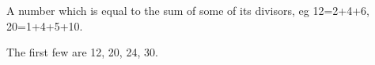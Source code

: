  A number which is equal to the sum of some of its divisors,
eg 12=2+4+6, 20=1+4+5+10.
\par
The first few are 12, 20, 24, 30.
